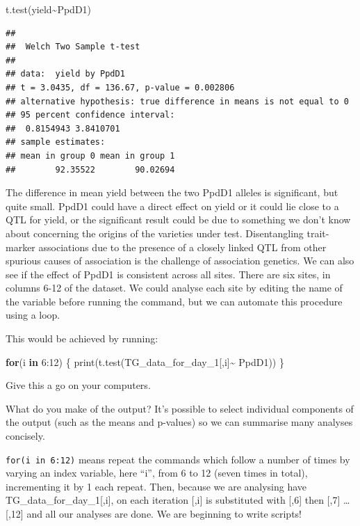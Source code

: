 \documentclass[
]{book}
\newenvironment{Shaded}{\begin{snugshade}}{\end{snugshade}}
\newcommand{\ControlFlowTok}[1]{\textcolor[rgb]{0.13,0.29,0.53}{\textbf{#1}}}
\newcommand{\DecValTok}[1]{\textcolor[rgb]{0.00,0.00,0.81}{#1}}
\newcommand{\FunctionTok}[1]{\textcolor[rgb]{0.00,0.00,0.00}{#1}}
\newcommand{\NormalTok}[1]{#1}
\newcommand{\SpecialCharTok}[1]{\textcolor[rgb]{0.00,0.00,0.00}{#1}}
\begin{document}
\begin{Shaded}
\begin{Highlighting}[]
\FunctionTok{t.test}\NormalTok{(yield}\SpecialCharTok{\textasciitilde{}}\NormalTok{PpdD1)}
\end{Highlighting}
\end{Shaded}

\begin{verbatim}
## 
##  Welch Two Sample t-test
## 
## data:  yield by PpdD1
## t = 3.0435, df = 136.67, p-value = 0.002806
## alternative hypothesis: true difference in means is not equal to 0
## 95 percent confidence interval:
##  0.8154943 3.8410701
## sample estimates:
## mean in group 0 mean in group 1 
##        92.35522        90.02694
\end{verbatim}

The difference in mean yield between the two PpdD1 alleles is significant, but quite small. PpdD1 could have a direct effect on yield or it could lie close to a QTL for yield, or the significant result could be due to something we don't know about concerning the origins of the varieties under test. Disentangling trait-marker associations due to the presence of a closely linked QTL from other spurious causes of association is the challenge of association genetics. We can also see if the effect of PpdD1 is consistent across all sites. There are six sites, in columns 6-12 of the dataset. We could analyse each site by editing the name of the variable before running the command, but we can automate this procedure using a loop.

This would be achieved by running:

\begin{Shaded}
\begin{Highlighting}[]
\ControlFlowTok{for}\NormalTok{(i }\ControlFlowTok{in} \DecValTok{6}\SpecialCharTok{:}\DecValTok{12}\NormalTok{) \{}
   \FunctionTok{print}\NormalTok{(}\FunctionTok{t.test}\NormalTok{(TG\_data\_for\_day\_1[,i]}\SpecialCharTok{\textasciitilde{}}\NormalTok{ PpdD1))}
\NormalTok{       \}}
\end{Highlighting}
\end{Shaded}

Give this a go on your computers.

What do you make of the output? It's possible to select individual components of the output (such as the means and p-values) so we can summarise many analyses concisely.

\texttt{for(i\ in\ 6:12)} means repeat the commands which follow a number of times by varying an index variable, here ``i'', from 6 to 12 (seven times in total), incrementing it by 1 each repeat. Then, because we are analysing have TG\_data\_for\_day\_1{[},i{]}, on each iteration {[},i{]} is substituted with {[},6{]} then {[},7{]} \ldots{} {[},12{]} and all our analyses are done. We are beginning to write scripts!
\end{document}
